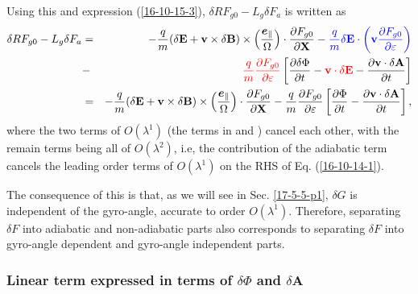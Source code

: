 \documentclass{article}
\newcommand{\tmcolor}[2]{{\color{#1}{#2}}}
\newcommand{\tmmathbf}[1]{\ensuremath{\boldsymbol{#1}}}
\begin{document}
Using this and expression (\ref{16-10-15-3}), $\delta R F_{g 0} - L_g \delta
F_a$ is written as
\begin{eqnarray}
  \delta R F_{g 0} - L_g \delta F_a & = & - \frac{q}{m} (\delta
  \mathbf{E}+\mathbf{v} \times \delta \mathbf{B}) \times \left(
  \frac{\tmmathbf{e}_{\parallel}}{\Omega}  \right) \cdot \frac{\partial F_{g
  0}}{\partial \mathbf{X}} - \tmcolor{blue}{\frac{q}{m} \delta \mathbf{E}
  \cdot \left( \mathbf{v} \frac{\partial F_{g 0}}{\partial \varepsilon}
  \right)} \nonumber\\
  & - & \tmcolor{red}{\frac{q}{m}  \frac{\partial F_{g 0}}{\partial
  \varepsilon}} \left[ \frac{\partial \delta \Phi}{\partial t} -
  \tmcolor{red}{\mathbf{v} \cdot \delta \mathbf{E}} - \frac{\partial
  \mathbf{v} \cdot \delta \mathbf{A}}{\partial t} \right] \nonumber\\
  & = & - \frac{q}{m} (\delta \mathbf{E}+\mathbf{v} \times \delta \mathbf{B})
  \times \left( \frac{\tmmathbf{e}_{\parallel}}{\Omega}  \right) \cdot
  \frac{\partial F_{g 0}}{\partial \mathbf{X}} - \frac{q}{m}  \frac{\partial
  F_{g 0}}{\partial \varepsilon} \left[ \frac{\partial \Phi}{\partial t} -
  \frac{\partial \mathbf{v} \cdot \delta \mathbf{A}}{\partial t} \right], 
  \label{16-10-13-e6}
\end{eqnarray}
where the two terms of $O (\lambda^1)$ (the terms in \tmcolor{blue}{blue} and
\tmcolor{red}{red}) cancel each other, with the remain terms being all of $O
(\lambda^2)$, i.e, the contribution of the adiabatic term cancels the leading
order terms of $O (\lambda^1)$ on the RHS of Eq. (\ref{16-10-14-1}).

The consequence of this is that, as we will see in Sec. \ref{17-5-5-p1},
$\delta G$ is independent of the gyro-angle, accurate to order $O
(\lambda^1)$. Therefore, separating $\delta F$ into adiabatic and
non-adiabatic parts also corresponds to separating $\delta F$ into gyro-angle
dependent and gyro-angle independent parts.

\subsubsection{Linear term expressed in terms of $\delta \Phi$ and $\delta
\mathbf{A}$}
\end{document}
